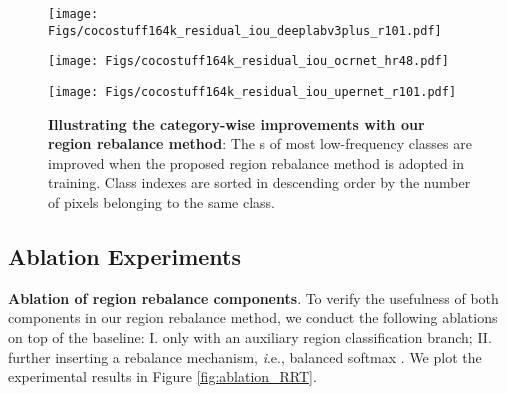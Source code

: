 \documentclass[final]{cvpr}
\begin{document}
\begin{figure*}[t]
	\begin{center}
		\begin{minipage}[t]{0.32\textwidth} 
			\begin{center}
				\texttt{[image: Figs/cocostuff164k\_residual\_iou\_deeplabv3plus\_r101.pdf]} 
				\label{fig:residual_iou_deeplabv3plus} 
			\end{center} 
		\end{minipage} 
		\hspace{0.05in}
		\begin{minipage}[t]{0.32\textwidth} 
			\begin{center}
				\texttt{[image: Figs/cocostuff164k\_residual\_iou\_ocrnet\_hr48.pdf]} 
				\label{fig:residual_iou_ocrnet} 
			\end{center} 
		\end{minipage} 
		\hspace{0.05in}
		\begin{minipage}[t]{0.32\textwidth} 
			\begin{center}
				\texttt{[image: Figs/cocostuff164k\_residual\_iou\_upernet\_r101.pdf]} 
				\label{fig:residual_iou_upernet} 
			\end{center}
		\end{minipage}
	\end{center}
	\vspace{-0.15in}
	\caption{\textbf{Illustrating the category-wise improvements with our region rebalance method}: The s of most low-frequency classes are improved when the proposed region rebalance method is adopted in training. Class indexes are sorted in descending order by the number of pixels belonging to the same class.}
	\label{fig:residual_iou_cocostuff164k}
	\vspace{-0.1in}
\end{figure*}


\subsection{Ablation Experiments}

\vspace{1mm}
\noindent\textbf{Ablation of region rebalance components}.
To verify the usefulness of both components in our region rebalance method, we conduct the following ablations on top of the baseline: I. only with an auxiliary region classification branch; II. further inserting a rebalance mechanism, {\textit i.e.}, balanced softmax \cite{DBLP:conf/nips/RenYSMZYL20}. We plot the experimental results in Figure \ref{fig:ablation_RRT}.
\end{document}
